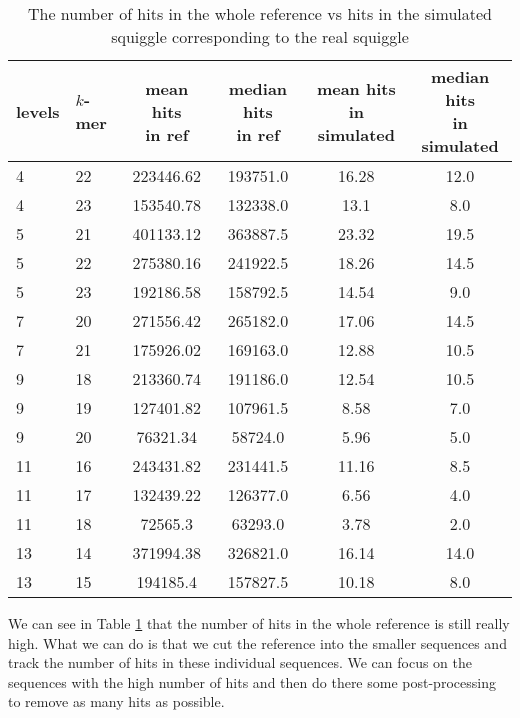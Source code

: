 \begin{table}
\caption[TODO]{The number of hits in the whole reference vs hits in the simulated
squiggle corresponding to the real squiggle}
\label{tab:hitsRefvsSimul}
\begin{center}
\begin{tabular}{|l|l|c|c|c|c|}
\hline
levels & $k$-mer & \specialcell{mean hits\\in ref} & \specialcell{median hits\\in ref} & \specialcell{mean hits\\in simulated} & \specialcell{median hits\\in simulated} \\
\hline
4 & 22 & 223446.62 & 193751.0 & 16.28 & 12.0 \\
\hline
4 & 23 & 153540.78 & 132338.0 & 13.1 & 8.0 \\
\hline
5 & 21 & 401133.12 & 363887.5 & 23.32 & 19.5 \\
\hline
5 & 22 & 275380.16 & 241922.5 & 18.26 & 14.5 \\
\hline
5 & 23 & 192186.58 & 158792.5 & 14.54 & 9.0 \\
\hline
7 & 20 & 271556.42 & 265182.0 & 17.06 & 14.5 \\
\hline
7 & 21 & 175926.02 & 169163.0 & 12.88 & 10.5 \\
\hline
9 & 18 & 213360.74 & 191186.0 & 12.54 & 10.5 \\
\hline
9 & 19 & 127401.82 & 107961.5 & 8.58 & 7.0 \\
\hline
9 & 20 & 76321.34 & 58724.0 & 5.96 & 5.0 \\
\hline
11 & 16 & 243431.82 & 231441.5 & 11.16 & 8.5 \\
\hline
11 & 17 & 132439.22 & 126377.0 & 6.56 & 4.0 \\
\hline
11 & 18 & 72565.3 & 63293.0 & 3.78 & 2.0 \\
\hline
13 & 14 & 371994.38 & 326821.0 & 16.14 & 14.0 \\
\hline
13 & 15 & 194185.4 & 157827.5 & 10.18 & 8.0 \\
\hline
\end{tabular}
\end{center}
\end{table}

We can see in Table \ref{tab:hitsRefvsSimul} that the number of hits in the whole reference is still really high.
What we can do is that we cut the reference into the smaller sequences and track the number
of hits in these individual sequences. We can focus on the sequences with the high number
of hits and then do there some post-processing to remove as many hits as possible.

